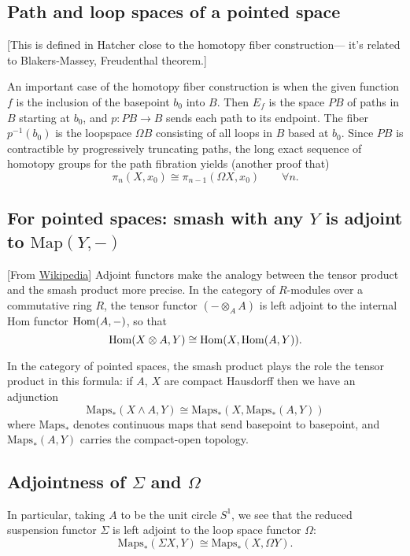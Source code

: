 \begin{remark}
\subsection{Path and loop spaces of a pointed space}
[This is defined in Hatcher close to the homotopy fiber construction--- it's related to Blakers-Massey, Freudenthal theorem.]

\begin{definition}
	An important case of the homotopy fiber construction is when the given function $f$ is the inclusion of the basepoint $b_0$ into $B$. Then $E_{f}$ is the space $PB$ of paths in $B$ starting at $b_{0}$,  and $p:PB\to B$ sends each path to its endpoint. The fiber $p^{-1}(b_{0})$ is the loopspace $\Omega B$ consisting of all loops in  $B$ based at $b_{0}$. Since $PB$ is contractible by progressively truncating paths, the long exact sequence of homotopy groups for the path fibration yields (another proof that)
	$$\pi_{n}(X,x_{0})\cong \pi_{n-1}(\Omega X,x_{0})\qquad \forall n.$$
\end{definition}

\subsection{For pointed spaces: smash with any \texorpdfstring{$Y$}{Y}		 is adjoint to  \texorpdfstring{$\text{Map}(Y,-)$}{Map(Y,-)}}

[From \href{https://en.wikipedia.org/wiki/Smash_product#}{Wikipedia}] 
Adjoint functors make the analogy between the tensor product 
and the smash product more
precise. In the category of $R$-modules over a commutative ring $R$, the tensor
functor $(-\otimes_{A} A)$ is left adjoint to the internal Hom functor
$\mathop{\mathrm{Hom}}\nolimits(A,-)$, so that 
$$
\mathop{\mathrm{Hom}}\nolimits(X\otimes A,Y)\cong\mathop{\mathrm{Hom}}\nolimits(X,\mathop{\mathrm{Hom}}\nolimits(A,Y)).
$$

In the category of pointed spaces, the smash product plays the role the tensor product in this formula: if $A$, $X$ are compact Hausdorff then we have an adjunction
$$\text{Maps}_{*}(X\wedge A,Y)\cong \text{Maps}_{*}(X,\text{Maps}_{*}(A,Y))$$
where $\text{Maps}_{*}$ denotes continuous maps that send basepoint to basepoint, and $\text{Maps}_{*}(A,Y)$ carries the compact-open topology.

\subsection{Adjointness of \texorpdfstring{$\Sigma$}{Σ} and \texorpdfstring{$\Omega$}{Ω}}
In particular, taking $A$ to be the unit circle $S^{1}$, we see that the reduced suspension functor $\Sigma$ is left adjoint to the loop space functor $\Omega$:
$$\text{Maps}_{*}(\Sigma X,Y)\cong \text{Maps}_{*}(X,\Omega Y).$$


\end{remark}
